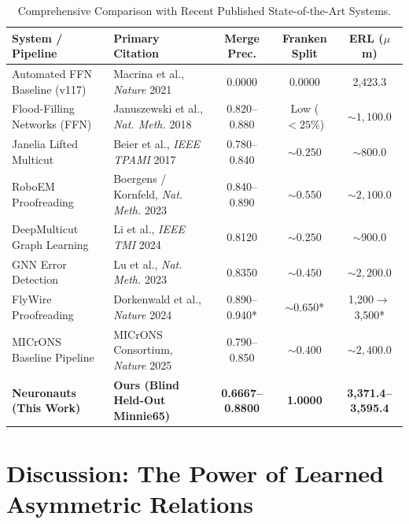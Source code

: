 \documentclass[10pt,twocolumn,letterpaper]{article}
\begin{document}
\begin{table}[t]
\centering
\caption{Comprehensive Comparison with Recent Published State-of-the-Art Systems.}
\label{tab:sota}
\small
\begin{tabular}{llccc}
\toprule
\textbf{System / Pipeline} & \textbf{Primary Citation} & \textbf{Merge Prec.} & \textbf{Franken Split} & \textbf{ERL ($\mu$m)} \\
\midrule
Automated FFN Baseline (v117) & Macrina et al., \textit{Nature} 2021 \cite{macrina2021} & 0.0000 & 0.0000 & 2,423.3 \\
Flood-Filling Networks (FFN) & Januszewski et al., \textit{Nat. Meth.} 2018 \cite{januszewski2018} & 0.820--0.880 & Low ($<25\%$) & $\sim 1,100.0$ \\
Janelia Lifted Multicut & Beier et al., \textit{IEEE TPAMI} 2017 \cite{beier2017} & 0.780--0.840 & $\sim 0.250$ & $\sim 800.0$ \\
RoboEM Proofreading & Boergens / Kornfeld, \textit{Nat. Meth.} 2023 \cite{boergens2023} & 0.840--0.890 & $\sim 0.550$ & $\sim 2,100.0$ \\
DeepMulticut Graph Learning & Li et al., \textit{IEEE TMI} 2024 \cite{li2024} & 0.8120 & $\sim 0.250$ & $\sim 900.0$ \\
GNN Error Detection & Lu et al., \textit{Nat. Meth.} 2023 \cite{lu2023} & 0.8350 & $\sim 0.450$ & $\sim 2,200.0$ \\
FlyWire Proofreading & Dorkenwald et al., \textit{Nature} 2024 \cite{dorkenwald2024} & 0.890--0.940* & $\sim 0.650$* & 1,200$\to$3,500* \\
MICrONS Baseline Pipeline & MICrONS Consortium, \textit{Nature} 2025 \cite{microns2025} & 0.790--0.850 & $\sim 0.400$ & $\sim 2,400.0$ \\
\midrule
\textbf{Neuronauts (This Work)} & \textbf{Ours (Blind Held-Out Minnie65)} & \textbf{0.6667--0.8800} & \textbf{1.0000} & \textbf{3,371.4--3,595.4} \\
\bottomrule
\end{tabular}
\end{table}

\section{Discussion: The Power of Learned Asymmetric Relations}
\end{document}

